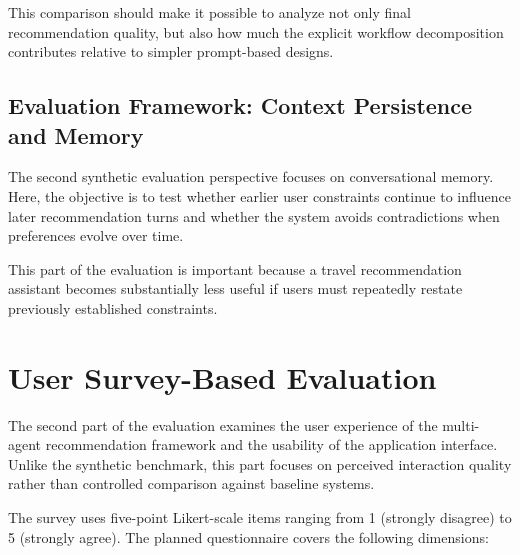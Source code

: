 This comparison should make it possible to analyze not only final recommendation quality, but also how much the explicit workflow decomposition contributes relative to simpler prompt-based designs.

\subsection{Evaluation Framework: Context Persistence and Memory}\label{subsection:evaluation:memory}
The second synthetic evaluation perspective focuses on conversational memory. Here, the objective is to test whether earlier user constraints continue to influence later recommendation turns and whether the system avoids contradictions when preferences evolve over time.

This part of the evaluation is important because a travel recommendation assistant becomes substantially less useful if users must repeatedly restate previously established constraints.

\section{User Survey-Based Evaluation}\label{section:evaluation:user-survey}
The second part of the evaluation examines the user experience of the multi-agent recommendation framework and the usability of the application interface. Unlike the synthetic benchmark, this part focuses on perceived interaction quality rather than controlled comparison against baseline systems.

The survey uses five-point Likert-scale items ranging from 1 (strongly disagree) to 5 (strongly agree). The planned questionnaire covers the following dimensions:

